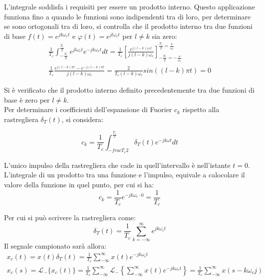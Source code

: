 \documentclass{article}
\numberwithin{equation}{subsection}
\begin{document}
L'integrale soddisfa i requisiti per essere un prodotto interno. Questo applicazione funziona fino a quando le funzioni sono indipendenti tra di loro, per determinare 
se sono ortogonali tra di loro, si controlla che il prodotto interno tra due funzioni di base $f(t)=e^{jk\omega_ct}$ e $\varphi(t)=e^{jl\omega_ct}$ per $l\neq k$ sia zero:
\begin{gather}
    \displaystyle\frac{1}{T_c}\int_{-\frac{T_c}{2}}^{\frac{T_c}{2}}e^{jl\omega_ct}e^{-jk\omega_ct}dt=
    \frac{1}{T_c}\left[\frac{e^{j(l-k)\omega_ct}}{j(l-k)\omega_c}\right]^{\frac{T_c}{2}=\frac{\pi}{\omega_c}}_{-\frac{T_c}{2}=-\frac{\pi}{\omega_c}}\\
    \displaystyle\frac{1}{T_c}\frac{e^{j(l-k)\pi t}-e^{-j(l-k)\pi t}}{j(l-k)\omega_c}=\frac{2}{T_c(l-k)\omega_c}sin((l-k)\pi t)=0
\end{gather} 

Si è verificato che il prodotto interno definito precedentemente tra due funzioni di base è zero per $l\neq k$.\\
Per determinare i coefficienti dell'espansione di Fuorier $c_k$ rispetto alla rastregliera $\delta_T(t)$, si considera:

\begin{equation}
    c_k=\displaystyle\frac{1}{T_c}\int_{-frac{T_c}{2}}^{\frac{T_c}{2}}\delta_T(t)e^{-jk\omega t}dt
\end{equation}

L'unico impulso della rastregliera che cade in quell'intervallo è nell'istante $t=0$. L'integrale di un prodotto tra una funzione e l'impulso, equivale a calocolare il valore 
della funzione in quel punto, per cui si ha:
\begin{equation}
    c_k=\displaystyle\frac{1}{T_c}e^{-jk\omega_c \cdot0}=\frac{1}{T_c}
\end{equation}

Per cui si può scrivere la rastregliera come:
\begin{equation}
    \delta_T(t)=\displaystyle\frac{1}{T_c}\sum_{k=-\infty}^{\infty}e^{jk\omega_ct}
\end{equation}
Il segnale campionato sarà allora:
\begin{gather}
    x_c(t)=x(t)\delta_T(t)=\displaystyle\frac{1}{T_c}\sum_{-\infty}^{\infty}x(t)e^{-jk\omega_ct}\\
    x_c(s)=\mathscr{L}_-\{x_c(t)\}=\displaystyle\frac{1}{T_c}\sum_{-\infty}^{\infty}\mathscr{L}_-\left\{\sum_{-\infty}^{\infty}x(t)e^{-jk\omega_ct}\right\}=\frac{1}{T_c}\sum_{-\infty}^{\infty}x(s-k\omega_cj)
\end{gather}
\end{document}
